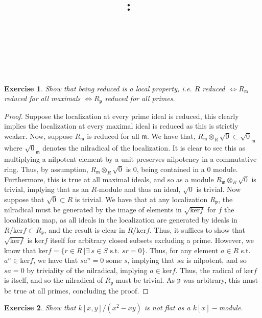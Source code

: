 \documentclass{article}
\title{
    \vspace{2in}
    \textmd{\textbf{\hmwkClass:\ \hmwkTitle}}\\
    \vspace{0.1in}
    \textmd{\hmwkDueDate} \\
    \vspace{0.2in}\large{\textit{\hmwkClassInstructor\  }}
    \vspace{2in}
}
\author{\hmwkAuthorName}
\date{}
\newcommand{\fk}[1]{\mathfrak{#1}}
\newtheorem{exercise}{Exercise}
\begin{document}
\maketitle
\newpage

\begin{exercise}
Show that being reduced is a local property, i.e. $R$ reduced $\iff R_{\fk{m}}$ reduced for all maximals $\iff R_{\fk{p}}$ reduced for all primes.  
\end{exercise}
\begin{proof}
  Suppose the localization at every prime ideal is reduced, this clearly implies the localization at every maximal ideal is reduced as this is strictly weaker. Now, suppose $R_{\fk{m}}$ is reduced for all $\fk{m}$. We have that, $R_{\fk{m}}\otimes_{R} \sqrt{0} \subset \sqrt{0}_{\fk{m}}$ where $\sqrt{0}_{\fk{m}}$ denotes the nilradical of the localization. It is clear to see this as multiplying a nilpotent element by a unit preserves nilpotency in a commutative ring. Thus, by assumption, $R_{\fk{m}}\otimes_{R} \sqrt{0}$ is 0, being contained in a $0$ module. Furthermore, this is true at all maximal ideals, and so as a module $R_{\fk{m}}\otimes_{R} \sqrt{0}$ is trivial, implying that as an $R$-module and thus an ideal, $\sqrt{0}$ is trivial. Now suppose that $\sqrt{0} \subset R$ is trivial. We have that at any localization $R_{\fk{p}}$, the nilradical must be generated by the image of elements in $\sqrt{\text{ker} f}$ for $f$ the localization map, as all ideals in the localization are generated by ideals in $R/\text{ker}f \subset R_{\fk{p}}$, and the result is clear in $R/ \text{ker}f$. Thus, it suffices to show that $\sqrt{\text{ker} f}$ is $\text{ker}f$ itself for arbitrary closed subsets excluding a prime. However, we know that $\text{ker}f = \{r \in R \ | \exists \ s\in S \text{ s.t. }sr=0\}$. Thus, for any element $a \in R$ s.t. $a^{n} \in \text{ker}f$, we have that $sa^{n} = 0$ some $s$, implying that $sa$ is nilpotent, and so $sa=0$ by triviality of the nilradical, implying $ a \in \text{ker}f$. Thus, the radical of ker$f$ is itself, and so the nilradical of $R_{\fk{p}}$ must be trivial. As $\fk{p}$ was arbitrary, this must be true at all primes, concluding the proof.
\end{proof}
\begin{exercise}
  Show that $k[x,y]/(x^{2}-xy)$ is not flat as a $k[x]-$module. 
\end{exercise}
\end{document}
